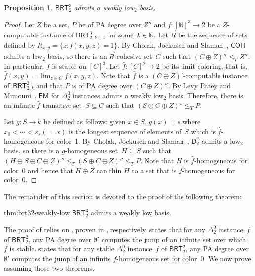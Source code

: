 \documentclass{article}
\newcommand{\EM}[0]{\mathsf{EM}}
\newcommand{\COH}[0]{\mathsf{COH}}
\newcommand{\BRT}[0]{\mathsf{BRT}}
\newcommand{\NN}[0]{\mathbb{N}}
\numberwithin{theorem}{section}
\newtheorem{proposition}[theorem]{Proposition}
\begin{document}
\begin{proposition}
$\BRT^3_2$ admits a weakly low${}_2$ basis.
\end{proposition}
\begin{proof}
Let $Z$ be a set, $P$ be of PA degree over $Z''$ and $f : [\NN]^3 \to 2$ be a $Z$-computable instance of $\BRT^3_{2,k+1}$ for some~$k \in \NN$. 
Let $\vec{R}$ be the sequence of sets defined by $R_{x, y} = \{ z : f(x, y, z) = 1 \}$. By Cholak, Jockusch and Slaman~\cite{cholak2001strength}, $\COH$ admits a low${}_2$ basis, so there is an $\vec{R}$-cohesive set~$C$ such that $(C \oplus Z)'' \leq_T Z''$. In particular, $f$ is stable on $[C]^3$. Let $\hat f : [C]^2 \to 2$ be its limit coloring, that is, $\hat f(x, y) = \lim_{z \in C} f(x, y, z)$. Note that $\hat f$ is a $(C \oplus Z)'$-computable instance of~$\BRT^2_{2,k}$ and that $P$ is of PA degree over $(C \oplus Z)''$. By Levy Patey and Mimouni~\cite[Theorem 7.1]{levy2025weakness}, $\EM$ for $\Delta^0_2$ instances admits a weakly low${}_2$ basis. Therefore, there is an infinite $\hat f$-transitive set~$S \subseteq C$ such that $(S \oplus C \oplus Z)'' \leq_T P$. 

Let $g : S \to k$ be defined as follows: 
given $x \in S$, $g(x) = s$ where $x_0 < \cdots < x_s (=x)$ is the longest sequence of elements of~$S$ which is $\hat f$-homogeneous for color~1. By Cholak, Jockusch and Slaman~\cite{cholak2001strength}, $\mathsf{D}^2_2$ admits a low${}_2$ basis, so there is a $g$-homogeneous set~$H \subseteq S$ such that $(H \oplus S \oplus C \oplus Z)'' \leq_T (S \oplus C \oplus Z)'' \leq_T P$. Note that $H$ is $\hat f$-homogeneous for color~0 and hence that $H \oplus Z$ can thin $H$ to a set that is $f$-homogeneous for color~0.
\end{proof}

The remainder of this section is devoted to the proof of the following theorem:

\begin{reptheorem}{thm:brt32-weakly-low}
$\BRT^3_2$ admits a weakly low basis.
\end{reptheorem}

The proof of  relies on , proven in , respectively.  
 states that for any $\Delta^0_2$ instance~$f$ of $\BRT^2_2$, any PA degree over $\emptyset'$ computes the jump of an infinite set over which~$f$ is stable.
 states that for any stable $\Delta^0_2$ instance~$f$ of $\BRT^2_2$, any PA degree over $\emptyset'$ computes the jump of an infinite $f$-homogeneous set for color~0.
We now prove  assuming those two theorems.
\end{document}
